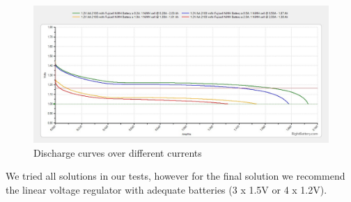 \begin{figure}[htbp]
\begin{center}
\includegraphics[width=1.0\columnwidth]{images/discharge_curves.jpg}
\end{center}
\caption{Discharge curves over different currents}
\label{fig:dischage_curve}
\end{figure}


We tried all solutions in our tests, however for the final solution we recommend the linear voltage regulator with adequate batteries (3 x 1.5V or 4 x 1.2V).

